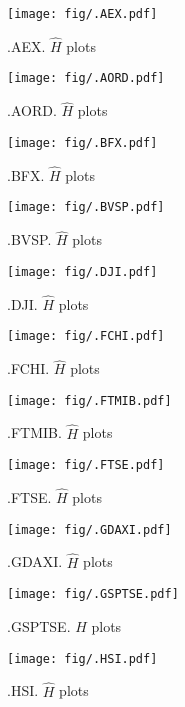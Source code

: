 	\begin{figure}[h]
		\centering
		\texttt{[image: fig/.AEX.pdf]}
		\caption{.AEX. $\hat{H}$ plots}
	\end{figure}

	\begin{figure}[h]
		\centering
		\texttt{[image: fig/.AORD.pdf]}
		\caption{.AORD. $\hat{H}$ plots}
	\end{figure}

	\begin{figure}[h]
		\centering
		\texttt{[image: fig/.BFX.pdf]}
		\caption{.BFX. $\hat{H}$ plots}
	\end{figure}

	\begin{figure}[h]
		\centering
		\texttt{[image: fig/.BVSP.pdf]}
		\caption{.BVSP. $\hat{H}$ plots}
	\end{figure}

	\begin{figure}[h]
		\centering
		\texttt{[image: fig/.DJI.pdf]}
		\caption{.DJI. $\hat{H}$ plots}
	\end{figure}

	\begin{figure}[h]
		\centering
		\texttt{[image: fig/.FCHI.pdf]}
		\caption{.FCHI. $\hat{H}$ plots}
	\end{figure}

	\begin{figure}[h]
		\centering
		\texttt{[image: fig/.FTMIB.pdf]}
		\caption{.FTMIB. $\hat{H}$ plots}
	\end{figure}

	\begin{figure}[h]
		\centering
		\texttt{[image: fig/.FTSE.pdf]}
		\caption{.FTSE. $\hat{H}$ plots}
	\end{figure}

	\begin{figure}[h]
		\centering
		\texttt{[image: fig/.GDAXI.pdf]}
		\caption{.GDAXI. $\hat{H}$ plots}
	\end{figure}

	\begin{figure}[h]
		\centering
		\texttt{[image: fig/.GSPTSE.pdf]}
		\caption{.GSPTSE. $\hat{H}$ plots}
	\end{figure}

	\begin{figure}[h]
		\centering
		\texttt{[image: fig/.HSI.pdf]}
		\caption{.HSI. $\hat{H}$ plots}
	\end{figure}

